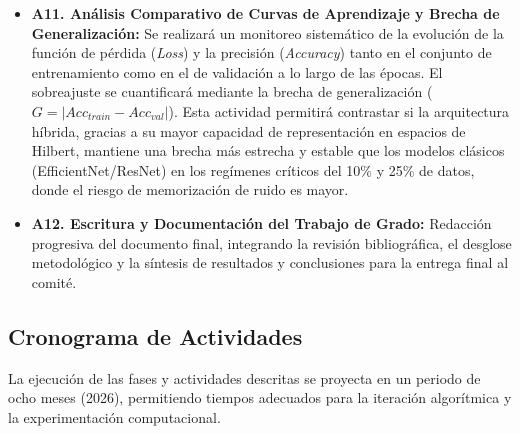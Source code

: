 \documentclass[12pt,letterpaper]{article}
\begin{document}
\begin{itemize}
        \item \textbf{A11. Análisis Comparativo de Curvas de Aprendizaje y Brecha de Generalización:} Se realizará un monitoreo sistemático de la evolución de la función de pérdida (\textit{Loss}) y la precisión (\textit{Accuracy}) tanto en el conjunto de entrenamiento como en el de validación a lo largo de las épocas. El sobreajuste se cuantificará mediante la brecha de generalización ($G = |Acc_{train} - Acc_{val}|$). Esta actividad permitirá contrastar si la arquitectura híbrida, gracias a su mayor capacidad de representación en espacios de Hilbert, mantiene una brecha más estrecha y estable que los modelos clásicos (EfficientNet/ResNet) en los regímenes críticos del 10\% y 25\% de datos, donde el riesgo de memorización de ruido es mayor.

        \item \textbf{A12. Escritura y Documentación del Trabajo de Grado:} Redacción progresiva del documento final, integrando la revisión bibliográfica, el desglose metodológico y la síntesis de resultados y conclusiones para la entrega final al comité.
    \end{itemize}
    
    \subsection{Cronograma de Actividades}
    La ejecución de las fases y actividades descritas se proyecta en un periodo de ocho meses (2026), permitiendo tiempos adecuados para la iteración algorítmica y la experimentación computacional.
    
\end{document}
